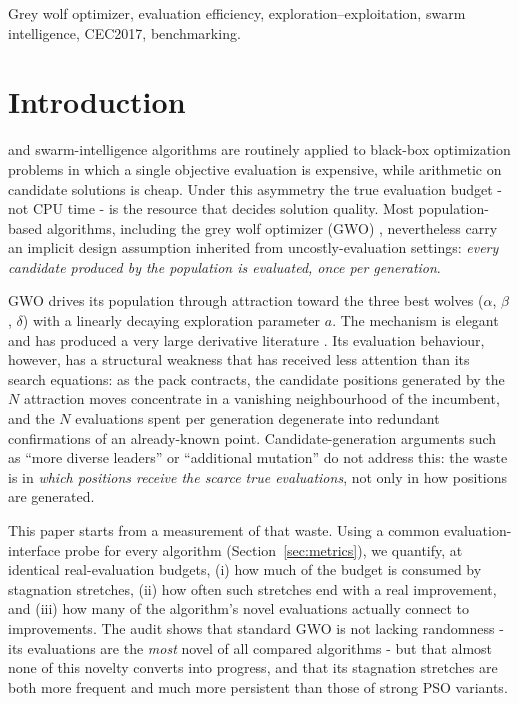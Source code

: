 \documentclass[journal]{IEEEtran}
\begin{document}
\begin{IEEEkeywords}
Grey wolf optimizer, evaluation efficiency, exploration--exploitation,
swarm intelligence, CEC2017, benchmarking.
\end{IEEEkeywords}

\section{Introduction}
 and swarm-intelligence algorithms are routinely
applied to black-box optimization problems in which a single objective
evaluation is expensive, while arithmetic on candidate solutions is cheap.
Under this asymmetry the true evaluation budget - not CPU time - is the
resource that decides solution quality. Most population-based algorithms,
including the grey wolf optimizer (GWO) \cite{mirjalili2014gwo}, nevertheless
carry an implicit design assumption inherited from uncostly-evaluation
settings: \emph{every candidate produced by the population is evaluated, once
per generation}. 

GWO drives its population through attraction toward the three best wolves
($\alpha$, $\beta$, $\delta$) with a linearly decaying exploration parameter
$a$. The mechanism is elegant and has produced a very large derivative
literature \cite{air2026review}. Its evaluation behaviour, however, has a
structural weakness that has received less attention than its search
equations: as the pack contracts, the candidate positions generated by the
$N$ attraction moves concentrate in a vanishing neighbourhood of the
incumbent, and the $N$ evaluations spent per generation degenerate into
redundant confirmations of an already-known point. Candidate-generation
arguments such as ``more diverse leaders'' or ``additional mutation'' do not
address this: the waste is in \emph{which positions receive the scarce true
evaluations}, not only in how positions are generated.

This paper starts from a measurement of that waste. Using a common
evaluation-interface probe for every algorithm (Section~\ref{sec:metrics}),
we quantify, at identical real-evaluation budgets, (i) how much of the budget
is consumed by stagnation stretches, (ii) how often such stretches end with a
real improvement, and (iii) how many of the algorithm's novel evaluations
actually connect to improvements. The audit shows that standard GWO is not
lacking randomness - its evaluations are the \emph{most} novel of all
compared algorithms - but that almost none of this novelty converts into
progress, and that its stagnation stretches are both more frequent and much
more persistent than those of strong PSO variants.
\end{document}

